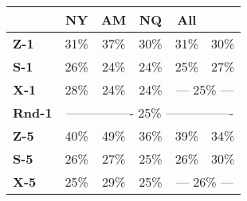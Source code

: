 \documentclass[10pt,twocolumn,letterpaper]{article}
\begin{document}
 \begin{table}[t]
\centering
\begin{small}
\begin{tabular}{l@{~}l@{~}l@{~}l@{~}l@{~}l}
\toprule
                              & \multicolumn{1}{c}{\textbf{NY}} & \multicolumn{1}{c}{\textbf{AM}} & \multicolumn{1}{c}{\textbf{NQ}} & \multicolumn{1}{c}{\textbf{All}} & \multicolumn{1}{c}{\textbf{~\cite{disentanglement}}} \\ \midrule
\textbf{Z-1}              & \multicolumn{1}{c}{31\%}                            & \multicolumn{1}{c}{37\%}                            & \multicolumn{1}{c}{30\%}                              & \multicolumn{1}{c}{31\%}                           & \multicolumn{1}{c}{30\%}                                \\
\textbf{S-1}               & \multicolumn{1}{c}{26\%}                            & \multicolumn{1}{c}{24\%}                            & \multicolumn{1}{c}{24\%}                              & \multicolumn{1}{c}{25\%}                           & \multicolumn{1}{c}{27\%}                                \\
\textbf{X-1} & \multicolumn{1}{c}{28\%}                            & \multicolumn{1}{c}{24\%}                            & \multicolumn{1}{c}{24\%}                              & \multicolumn{2}{c}{--- 25\% ---}                                               \\
\textbf{Rnd-1}  & \multicolumn{5}{c}{---------------- 25\% ----------------}                                                                                                                                                             \\ \midrule
\textbf{Z-5}             & \multicolumn{1}{c}{40\%}                            & \multicolumn{1}{c}{49\%}                            & \multicolumn{1}{c}{36\%}                              & \multicolumn{1}{c}{39\%}                           & \multicolumn{1}{c}{34\%}                                \\
\textbf{S-5}             & \multicolumn{1}{c}{26\%}                            & \multicolumn{1}{c}{27\%}                            & \multicolumn{1}{c}{25\%}                              & \multicolumn{1}{c}{26\%}                           & \multicolumn{1}{c}{30\%}                                \\
\textbf{X-5} & \multicolumn{1}{c}{25\%}                            & \multicolumn{1}{c}{29\%}                            & \multicolumn{1}{c}{25\%}                              & \multicolumn{2}{c}{--- 26\% ---}                                               \\

\end{tabular}
\end{small}
\end{table}
\end{document}

